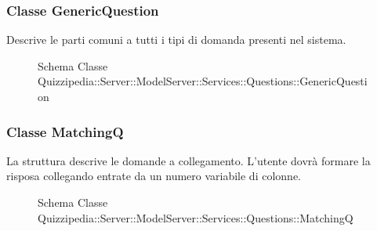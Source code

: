 \subsubsection{Classe GenericQuestion}
Descrive le parti comuni a tutti i tipi di domanda presenti nel sistema.
\begin{figure}[H]
\centering
\noindent{}
\caption{Schema Classe Quizzipedia::Server::ModelServer::Services::Questions::GenericQuestion}
\end{figure}
\subsubsection{Classe MatchingQ}
La struttura descrive le domande a collegamento. L'utente dovrà formare la risposa collegando entrate da un numero variabile di colonne.
\begin{figure}[H]
\centering
\noindent{}
\caption{Schema Classe Quizzipedia::Server::ModelServer::Services::Questions::MatchingQ}
\end{figure}
